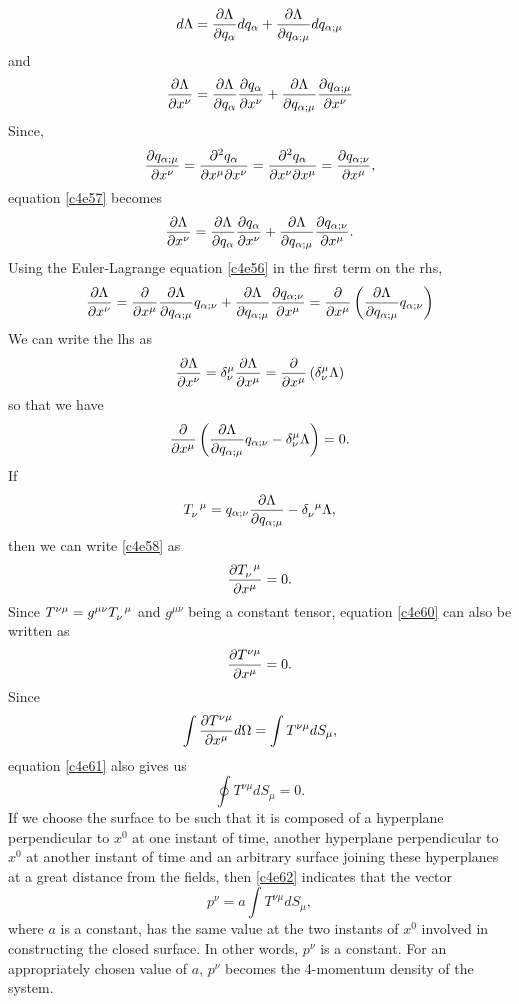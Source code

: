 \begin{enumerate}
\[
d\Lambda = \frac{\partial{\Lambda}}{\partial{q_\alpha}}dq_\alpha + 
\frac{\partial{\Lambda}}{\partial{q_{\alpha;\mu}}}dq_{\alpha;\mu}
\]
and
\begin{equation}\label{c4e57}
\frac{\partial{\Lambda}}{\partial{x^\nu}} = \frac{\partial{\Lambda}}{\partial{q_\alpha}}\frac{\partial{q_\alpha}}{\partial{x^\nu}} + 
\frac{\partial{\Lambda}}{\partial{q_{\alpha;\mu}}}\frac{\partial{q_{\alpha;\mu}}}{\partial{x^\nu}}
\end{equation}
Since,
\[
\frac{\partial{q_{\alpha;\mu}}}{\partial{x^\nu}} = 
\frac{\partial^2 q_\alpha}{\partial x^\mu \partial x^\nu}
= \frac{\partial^2 q_\alpha}{\partial x^\nu \partial x^\mu} =
\frac{\partial{q_{\alpha;\nu}}}{\partial{x^\mu}},
\]
equation \eqref{c4e57} becomes
\[
\frac{\partial{\Lambda}}{\partial{x^\nu}} = \frac{\partial{\Lambda}}{\partial{q_\alpha}}\frac{\partial{q_\alpha}}{\partial{x^\nu}} + 
\frac{\partial{\Lambda}}{\partial{q_{\alpha;\mu}}}\frac{\partial{q_{\alpha;\nu}}}{\partial{x^\mu}}.
\]
Using the Euler-Lagrange equation \eqref{c4e56} in the first term on the rhs,
\[
\frac{\partial{\Lambda}}{\partial{x^\nu}} = \frac{\partial}{\partial x^\mu}
\frac{\partial{\Lambda}}{\partial{q_{\alpha;\mu}}}
q_{\alpha;\nu} + \frac{\partial{\Lambda}}{\partial{q_{\alpha;\mu}}}\frac{\partial{q_{\alpha;\nu}}}{\partial{x^\mu}} =
\frac{\partial}{\partial x^\mu}
\left(\frac{\partial{\Lambda}}{\partial{q_{\alpha;\mu}}}q_{\alpha;\nu}\right)
\]
We can write the lhs as
\[
\frac{\partial{\Lambda}}{\partial{x^\nu}} = \delta^\mu_\nu\frac{\partial{\Lambda}}{\partial{x^\mu}} = 
\frac{\partial}{\partial x^\mu}\left(\delta^\mu_\nu \Lambda\right)
\]
so that we have
\begin{equation}\label{c4e58}
\frac{\partial}{\partial x^\mu}
\left(\frac{\partial{\Lambda}}{\partial{q_{\alpha;\mu}}}q_{\alpha;\nu} - 
\delta^\mu_\nu \Lambda\right) = 0.
\end{equation}
If
\begin{equation}\label{c4e59}
\tensor{T}{_\nu^\mu} = q_{\alpha;\nu}\pdt{\Lambda}{q_{\alpha;\mu}} - 
\tensor{\delta}{_\nu^\mu} \Lambda,
\end{equation}
then we can write \eqref{c4e58} as
\begin{equation}\label{c4e60}
\pdt{\tensor{T}{_\nu^\mu}}{x^\mu} = 0.
\end{equation}
Since $T^{\nu\mu} = g^{\mu\nu}\tensor{T}{_\nu^\mu}$ and $g^{\mu\nu}$ being a 
constant tensor, equation \eqref{c4e60} can also be written as
\begin{equation}\label{c4e61}
\frac{\partial{T^{\nu\mu}}}{\partial{x^\mu}} = 0.
\end{equation}
Since
\[
\int \frac{\partial{T^{\nu\mu}}}{\partial{x^\mu}} d\Omega = \int T^{\nu\mu} dS_\mu,
\]
equation \eqref{c4e61} also gives us
\begin{equation}\label{c4e62}
\oint T^{\nu\mu} dS_\mu = 0.
\end{equation}
If we choose the surface to be such that it is composed of a hyperplane 
perpendicular to $x^0$ at one instant of time, another hyperplane 
perpendicular to $x^0$ at another instant of time and an arbitrary surface
joining these hyperplanes at a great distance from the fields, then 
\eqref{c4e62} indicates that the vector
\begin{equation}\label{c4e63}
p^\nu = a\int T^{\nu\mu}dS_\mu,
\end{equation}
where $a$ is a constant, has the same value at the two instants of $x^0$ 
involved in constructing the closed surface. In other words, $p^\nu$ is a 
constant. For an appropriately chosen value of $a$, $p^\nu$ becomes the 
4-momentum density of the system.


\end{enumerate}
